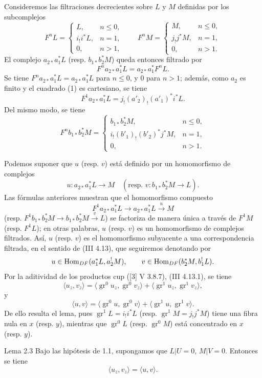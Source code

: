 Consideremos las filtraciones decrecientes sobre $L$ y $M$ definidas por los subcomplejos
\[
F^nL=
\begin{cases}
L,& n\le 0,\\
i_!i^*L,& n=1,\\
0,& n>1,
\end{cases}
\qquad
F^nM=
\begin{cases}
M,& n\le 0,\\
j_!j^*M,& n=1,\\
0,& n>1.
\end{cases}
\]
El complejo $a_{2*}a_1^*L$ (resp. $b_{1*}b_2^*M$) queda entonces filtrado por
\[
F^n a_{2*}a_1^*L=a_{2*}a_1^*F^nL.
\]
Se tiene $F^n a_{2*}a_1^*L=a_{2*}a_1^*L$ para $n\le 0$, y $0$ para $n>1$; además, como $a_2$ es finito y el cuadrado (1) es cartesiano, se tiene
\[
F^1a_{2*}a_1^*L=j_!(a'_2)_!(a'_1)^*i^*L.
\]
Del mismo modo, se tiene
\[
F^n b_{1*}b_2^*M=
\begin{cases}
b_{1*}b_2^*M,& n\le 0,\\
i_!(b'_1)_!(b'_2)^*j^*M,& n=1,\\
0,& n>1.
\end{cases}
\]

Podemos suponer que $u$ (resp. $v$) está definido por un homomorfismo de complejos
\[
u:a_{2*}a_1^*L\longrightarrow M
\quad
(\text{resp. }v:b_{1*}b_2^*M\longrightarrow L).
\]
Las fórmulas anteriores muestran que el homomorfismo compuesto
\[
F^1a_{2*}a_1^*L\longrightarrow a_{2*}a_1^*L\xrightarrow{u}M
\]
(resp. $F^1b_{1*}b_2^*M\to b_{1*}b_2^*M\xrightarrow{v}L$) se factoriza de manera única a través de $F^1M$ (resp. $F^1L$); en otras palabras, $u$ (resp. $v$) es un homomorfismo de complejos filtrados. Así, $u$ (resp. $v$) es el homomorfismo subyacente a una correspondencia filtrada, en el sentido de (III 4.13), que seguiremos denotando por
\[
u\in\operatorname{Hom}_{DF}(a_1^*L,a_2^!M),\qquad
v\in\operatorname{Hom}_{DF}(b_2^*M,b_1^!L).
\]
Por la aditividad de los productos cup ([3] V 3.8.7), (III 4.13.1), se tiene
\[
\langle u_z,v_z\rangle
 =\langle \operatorname{gr}^0u_z,\operatorname{gr}^0v_z\rangle
 +\langle \operatorname{gr}^1u_z,\operatorname{gr}^1v_z\rangle,
\]
y
\[
\langle u,v\rangle
 =\langle \operatorname{gr}^0u,\operatorname{gr}^0v\rangle
 +\langle \operatorname{gr}^1u,\operatorname{gr}^1v\rangle.
\]
De ello resulta el lema, pues $\operatorname{gr}^1L=i_!i^*L$ (resp. $\operatorname{gr}^1M=j_!j^*M$) tiene una fibra nula en $x$ (resp. $y$), mientras que $\operatorname{gr}^0L$ (resp. $\operatorname{gr}^0M$) está concentrado en $x$ (resp. $y$).

\begin{statement}{Lema 2.3}
Bajo las hipótesis de 1.1, supongamos que $L|U=0$, $M|V=0$. Entonces se tiene
\[
\langle u_z,v_z\rangle=\langle u,v\rangle .
\]
\end{statement}
